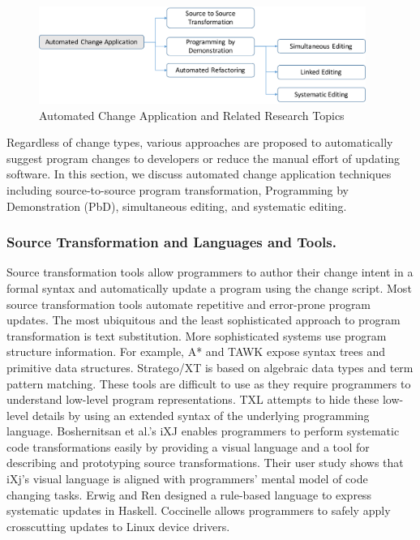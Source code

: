 \documentclass[runningheads,a4paper]{llncs}
\begin{document}
\begin{figure}[ht]
 \centering
 \includegraphics[width=0.95\textwidth]{images/AutomatedChange.pdf}
 \caption{Automated Change Application and Related Research Topics} 
 \label{fig:automaticapplication} 
\end{figure}



Regardless of change types, various approaches are proposed to automatically suggest program changes to developers or reduce the manual effort of updating software. In this section, we discuss automated change application techniques including source-to-source program transformation, Programming by Demonstration (PbD), simultaneous editing, and systematic editing.

\subsubsection{Source Transformation and Languages and Tools.} 

Source transformation tools allow programmers to author their change intent in a formal syntax and automatically update a program using the change script. Most source transformation tools automate repetitive and error-prone program updates. The most ubiquitous and the least sophisticated approach to program transformation is text substitution. More sophisticated systems use program structure information. For example, A* \cite{Ladd1995} and TAWK \cite{Griswold1996} expose syntax trees and primitive data structures. Stratego/XT\cite{Visser2004} is based on algebraic data types and term pattern matching. These tools are difficult to use as they require programmers to understand low-level program representations. TXL \cite{Cordy2006} attempts to hide these low-level details by using an extended syntax of the underlying programming language. Boshernitsan et al.'s iXJ \cite{Boshernitsan2007} enables programmers to perform systematic code transformations easily by providing a visual language and a tool for describing and prototyping source transformations. Their user study shows that iXj's visual language is aligned with programmers' mental model of code changing tasks. Erwig and Ren \cite{Erwig2002} designed a rule-based language to express systematic updates in Haskell. Coccinelle \cite{Padioleau2008:auto} allows programmers to safely apply crosscutting updates to Linux device drivers. 
\end{document}
